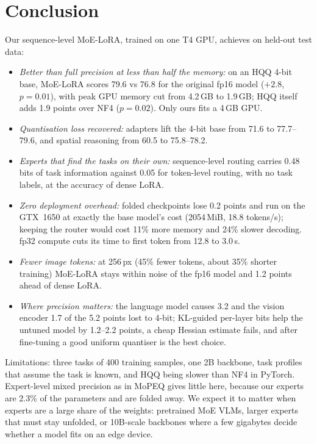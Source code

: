 \documentclass[conference]{IEEEtran}
\begin{document}
\section{Conclusion}
\label{sec:concl}
Our sequence-level MoE-LoRA, trained on one T4 GPU, achieves on held-out test data:
\begin{itemize}\setlength{\itemsep}{0pt}
\item \emph{Better than full precision at less than half the memory:} on an HQQ 4-bit base, MoE-LoRA
scores 79.6 vs 76.8 for the original fp16 model ($+2.8$, $p=0.01$), with peak GPU memory cut from
4.2\,GB to 1.9\,GB; HQQ itself adds 1.9 points over NF4 ($p=0.02$). Only ours fits a 4\,GB GPU.
\item \emph{Quantisation loss recovered:} adapters lift the 4-bit base from 71.6 to 77.7--79.6, and
spatial reasoning from 60.5 to 75.8--78.2.
\item \emph{Experts that find the tasks on their own:} sequence-level routing carries 0.48 bits of task
information against 0.05 for token-level routing, with no task labels, at the accuracy of dense LoRA.
\item \emph{Zero deployment overhead:} folded checkpoints lose 0.2 points and run on the GTX~1650 at
exactly the base model's cost (2054\,MiB, 18.8 tokens/s); keeping the router would cost 11\% more
memory and 24\% slower decoding. fp32 compute cuts its time to first token from 12.8 to 3.0\,s.
\item \emph{Fewer image tokens:} at 256\,px (45\% fewer tokens, about 35\% shorter training) MoE-LoRA
stays within noise of the fp16 model and 1.2 points ahead of dense LoRA.
\item \emph{Where precision matters:} the language model causes 3.2 and the vision encoder 1.7 of the
5.2 points lost to 4-bit; KL-guided per-layer bits help the untuned model by 1.2--2.2 points, a cheap
Hessian estimate fails, and after fine-tuning a good uniform quantiser is the best choice.
\end{itemize}
Limitations: three tasks of 400 training samples, one 2B backbone, task profiles that assume the task is
known, and HQQ being slower than NF4 in PyTorch. Expert-level mixed precision as in MoPEQ gives little here,
because our experts are 2.3\% of the parameters and are folded away. We expect it to matter when experts
are a large share of the weights: pretrained MoE VLMs, larger experts that must stay unfolded, or
10B-scale backbones where a few gigabytes decide whether a model fits on an edge device.



\end{document}
